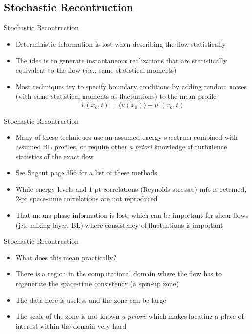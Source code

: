 \subsection{Stochastic Recontruction}
\begin{frame}{Stochastic Recontruction}
	\begin{itemize}
	\item Deterministic information is lost when describing the flow statistically
	\item The idea is to generate instantaneous realizations that are statistically equivalent to the flow (\textit{i.e.}, same statistical moments)
	\item Most techniques try to specify boundary conditions by adding random noises (with same statistical moments as fluctuations) to the mean profile
	$$\tilde{u}(x_o,t) = \langle \tilde{u}(x_o)\rangle + u^\prime (x_o,t)$$ 
	\end{itemize}
\end{frame}
\begin{frame}{Stochastic Recontruction}
	\begin{itemize}
	\item Many of these techniques use an assumed energy spectrum combined with assumed BL profiles, or require other \textit{a priori} knowledge of turbulence statistics of the exact flow
	\item See Sagaut page 356 for a list of these methods
	\item While energy levels and 1-pt correlations (Reynolds stresses) info is retained, 2-pt space-time correlations are not reproduced
	\item That means phase information is lost, which can be important for shear flows (jet, mixing layer, BL) where consistency of fluctuations is important 
	\end{itemize}
\end{frame}
\begin{frame}{Stochastic Recontruction}
	\begin{itemize}
	\item What does this mean practically?
	\item There is a region in the computational domain where the flow has to regenerate the space-time consistency (a spin-up zone)
	\item The data here is useless and the zone can be large
	\item The scale of the zone is not known \textit{a priori}, which makes locating a place of interest within the domain very hard
	\end{itemize}
\end{frame}

